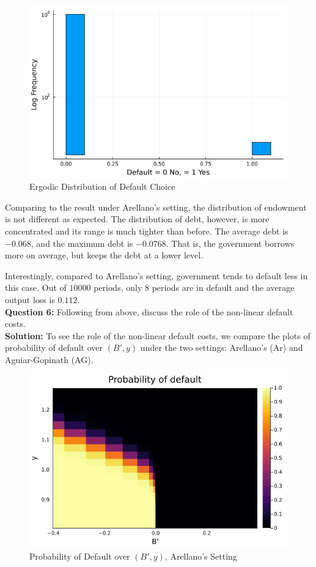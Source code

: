\documentclass{article}
\begin{document}
	\begin{figure}[htbp]
		\centering
		\includegraphics[scale=0.5]{default_histQ5.png}
		\caption{Ergodic Distribution of Default Choice}
	\end{figure}
	
	Comparing to the result under Arellano's setting, the distribution of endowment is not different as expected. The distribution of debt, however, is more concentrated and its range is much tighter than before. The average debt is $-0.068$, and the maximum debt is $-0.0768$. That is, the government borrows more on average, but keeps the debt at a lower level.
	
	Interestingly, compared to Arellano's setting, government tends to default less in this case. Out of $10000$ periods, only $8$ periods are in default and the average output loss is $0.112$. \\
	
	\noindent\textbf{Question 6:} Following from above, discuss the role of the non-linear default costs. \\
	
	\noindent\textbf{Solution:} To see the role of the non-linear default costs, we compare the plots of probability of default over $(B',y)$ under the two settings: Arellano's (Ar) and Aguiar-Gopinath (AG).
	
	\begin{figure}[htbp]
		\centering	
		\includegraphics[scale=0.4]{PofD_Ar.png}
		\caption{Probability of Default over $(B',y)$, Arellano's Setting}
	\end{figure}
	
\end{document}
